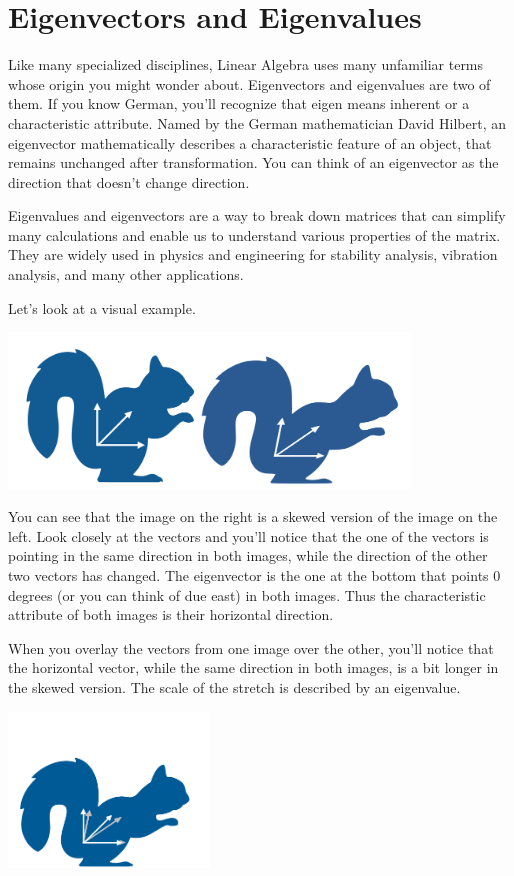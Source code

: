 \chapter{Eigenvectors and Eigenvalues}


Like many specialized disciplines, Linear Algebra uses many unfamiliar terms whose origin you might wonder about. Eigenvectors and eigenvalues are two of them. If you know German, you’ll recognize that eigen means inherent or a characteristic attribute. Named by the German mathematician David Hilbert, an eigenvector mathematically describes a characteristic feature of an object, that remains unchanged after transformation. You can think of an eigenvector as the direction that doesn’t change direction. 

Eigenvalues and eigenvectors are a way to break down matrices that can simplify many calculations and enable us to understand various properties of the matrix. They are widely used in physics and engineering for stability analysis, vibration analysis, and many other applications.  

Let’s look at a visual example.

\includegraphics[width=0.8\textwidth]{EigenSquirrel.png}

You can see that the  image on the right is a skewed version of the image on the left. Look closely at the vectors and you’ll notice that the one of the vectors is pointing in the same direction in both images, while the direction of the other two vectors has changed. The eigenvector is the one at the bottom that points 0 degrees (or you can think of due east) in both images. Thus the characteristic attribute of both images is their horizontal direction.

When you overlay the vectors from one image over the other, you’ll notice that the horizontal vector, while the same direction in both images, is a bit longer in the skewed version. The scale of the stretch is described by an eigenvalue.

\includegraphics[width=0.4\textwidth]{OverlaySquirrel.png}


